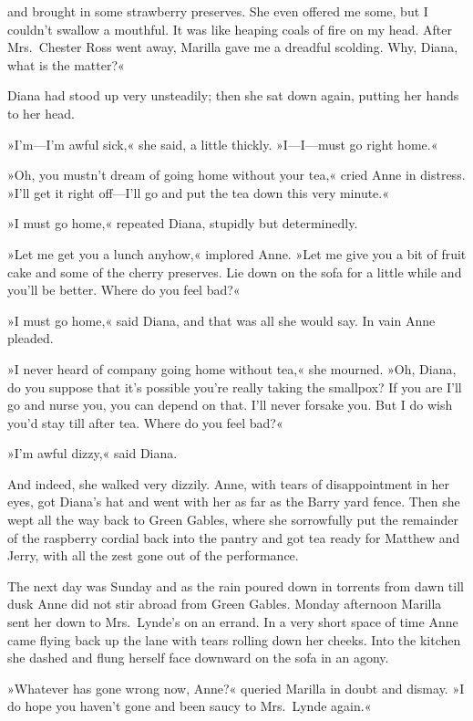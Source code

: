 and brought in some strawberry preserves. She even offered me some, but I couldn't swallow a mouthful. It was like heaping coals of fire on my head. After Mrs.~Chester Ross went away, Marilla gave me a dreadful scolding. Why, Diana, what is the matter?«

Diana had stood up very unsteadily; then she sat down again, putting her hands to her head.

»I'm—I'm awful sick,« she said, a little thickly. »I—I—must go right home.«

»Oh, you mustn't dream of going home without your tea,« cried Anne in distress. »I'll get it right off—I'll go and put the tea down this very minute.«

»I must go home,« repeated Diana, stupidly but determinedly.

»Let me get you a lunch anyhow,« implored Anne. »Let me give you a bit of fruit cake and some of the cherry preserves. Lie down on the sofa for a little while and you'll be better. Where do you feel bad?«

»I must go home,« said Diana, and that was all she would say. In vain Anne pleaded.

»I never heard of company going home without tea,« she mourned. »Oh, Diana, do you suppose that it's possible you're really taking the smallpox? If you are I'll go and nurse you, you can depend on that. I'll never forsake you. But I do wish you'd stay till after tea. Where do you feel bad?«

»I'm awful dizzy,« said Diana.

And indeed, she walked very dizzily. Anne, with tears of disappointment in her eyes, got Diana's hat and went with her as far as the Barry yard fence. Then she wept all the way back to Green Gables, where she sorrowfully put the remainder of the raspberry cordial back into the pantry and got tea ready for Matthew and Jerry, with all the zest gone out of the performance.

The next day was Sunday and as the rain poured down in torrents from dawn till dusk Anne did not stir abroad from Green Gables. Monday afternoon Marilla sent her down to Mrs.~Lynde's on an errand. In a very short space of time Anne came flying back up the lane with tears rolling down her cheeks. Into the kitchen she dashed and flung herself face downward on the sofa in an agony.

»Whatever has gone wrong now, Anne?« queried Marilla in doubt and dismay. »I do hope you haven't gone and been saucy to Mrs.~Lynde again.«

